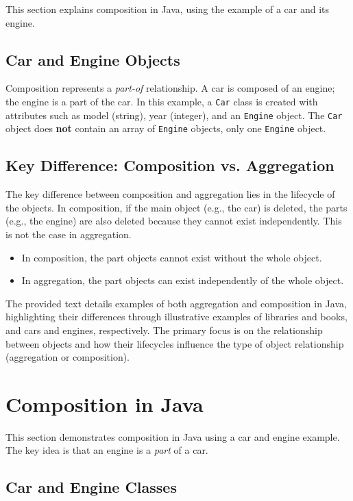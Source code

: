 \documentclass{article}
\begin{document}
This section explains composition in Java, using the example of a car and its engine.

\subsection{Car and Engine Objects}

Composition represents a \textit{part-of} relationship.  A car is composed of an engine; the engine is a part of the car.  In this example, a \texttt{Car} class is created with attributes such as model (string), year (integer), and an \texttt{Engine} object. The \texttt{Car} object does \textbf{not} contain an array of \texttt{Engine} objects, only one \texttt{Engine} object.


\subsection{Key Difference: Composition vs. Aggregation}

The key difference between composition and aggregation lies in the lifecycle of the objects. In composition, if the main object (e.g., the car) is deleted, the parts (e.g., the engine) are also deleted because they cannot exist independently.  This is not the case in aggregation.

\begin{itemize}
    \item In composition, the part objects cannot exist without the whole object.
    \item In aggregation, the part objects can exist independently of the whole object.
\end{itemize}

The provided text details examples of both aggregation and composition in Java, highlighting their differences through illustrative examples of libraries and books, and cars and engines, respectively.  The primary focus is on the relationship between objects and how their lifecycles influence the type of object relationship (aggregation or composition).


\section{Composition in Java}

This section demonstrates composition in Java using a car and engine example.  The key idea is that an engine is a \textit{part} of a car.

\subsection{Car and Engine Classes}
\end{document}

